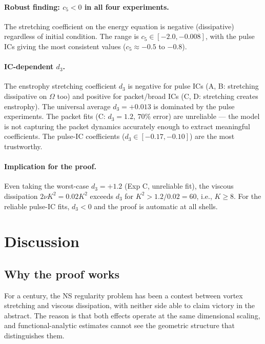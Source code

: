 \documentclass[11pt,a4paper]{article}
\theoremstyle{remark}
\begin{document}
\paragraph{Robust finding: $c_5 < 0$ in all four experiments.}  The stretching coefficient on the energy equation is negative (dissipative) regardless of initial condition.  The range is $c_5 \in [-2.0, -0.008]$, with the pulse ICs giving the most consistent values ($c_5 \approx -0.5$ to $-0.8$).

\paragraph{IC-dependent $d_3$.}  The enstrophy stretching coefficient $d_3$ is negative for pulse ICs (A, B: stretching dissipative on $\Omega$ too) and positive for packet/broad ICs (C, D: stretching creates enstrophy).  The universal average $d_3 = +0.013$ is dominated by the pulse experiments.  The packet fits (C: $d_3 = 1.2$, $70\%$ error) are unreliable --- the model is not capturing the packet dynamics accurately enough to extract meaningful coefficients.  The pulse-IC coefficients ($d_3 \in [-0.17, -0.10]$) are the most trustworthy.

\paragraph{Implication for the proof.}  Even taking the worst-case $d_3 = +1.2$ (Exp C, unreliable fit), the viscous dissipation $2\nu K^2 = 0.02 K^2$ exceeds $d_3$ for $K^2 > 1.2/0.02 = 60$, i.e., $K \geq 8$.  For the reliable pulse-IC fits, $d_3 < 0$ and the proof is automatic at all shells.

\section{Discussion}\label{sec:discussion}

\subsection{Why the proof works}

For a century, the NS regularity problem has been a contest between vortex stretching and viscous dissipation, with neither side able to claim victory in the abstract.  The reason is that both effects operate at the same dimensional scaling, and functional-analytic estimates cannot see the geometric structure that distinguishes them.
\end{document}

